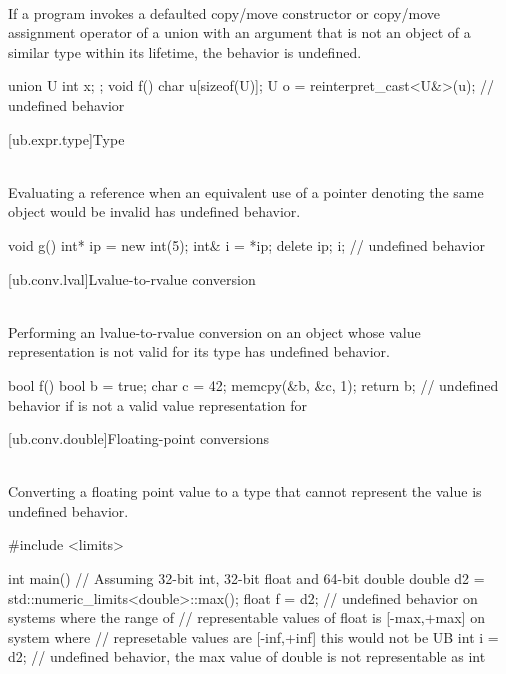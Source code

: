 \pnum
{} \\
If a program invokes a defaulted copy/move constructor or copy/move assignment
operator of a union with an argument that is not an object of a similar type
within its lifetime, the behavior is undefined.

\pnum
\begin{example}
\begin{codeblock}
union U { int x; };
void f()
{
   char u[sizeof(U)];
   U o = reinterpret_cast<U&>(u);  // undefined behavior
}
\end{codeblock}
\end{example}

[ub.expr.type]{Type}

\pnum
{} \\
Evaluating a reference when an equivalent use of a pointer denoting the same object
would be invalid has undefined behavior.

\pnum
\begin{example}
\begin{codeblock}
void g()
{
  int* ip = new int(5);
  int& i = *ip;
  delete ip;
  i;  // undefined behavior
}
\end{codeblock}
\end{example}

[ub.conv.lval]{Lvalue-to-rvalue conversion}

\pnum
{} \\
Performing an
lvalue-to-rvalue conversion
on an object whose
value representation
is not valid for its type
has undefined behavior.

\pnum
\begin{example}
\begin{codeblock}
bool f() {
  bool b = true;
  char c = 42;
  memcpy(&b, &c, 1);
  return b;         // undefined behavior if  is not a valid value representation for 
}
\end{codeblock}
\end{example}


[ub.conv.double]{Floating-point conversions}

\pnum
{} \\
Converting a floating point value to a type that cannot represent the value is undefined behavior.

\pnum
\begin{example}
\begin{codeblock}
#include <limits>

int main() {
  // Assuming 32-bit int, 32-bit float and 64-bit double
  double d2 = std::numeric_limits<double>::max();
  float f = d2; // undefined behavior on systems where the range of
                // representable values of float is [-max,+max] on system where
                // represetable values are [-inf,+inf] this would not be UB
  int i = d2;   // undefined behavior, the max value of double is not representable as int
}
\end{codeblock}
\end{example}



